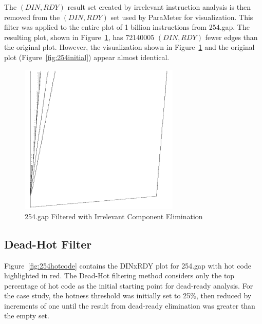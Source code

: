 \documentclass[defaultstyle,11pt]{thesis}
\begin{document}
The $(DIN,RDY)$ result set created by irrelevant instruction analysis is then
removed from the $(DIN,RDY)$ set used by ParaMeter for visualization.
This filter was applied to the entire plot of 1 billion instructions
from 254.gap.  The resulting plot, shown in
Figure~\ref{fig:254quickdead}, has 72140005 $(DIN,RDY)$ fewer edges
than the original plot.  However, the visualization shown in
Figure~\ref{fig:254quickdead} and the original plot
(Figure~\ref{fig:254initial}) appear almost identical.

\begin{figure}
\begin{center}
\includegraphics[width=3in]{images/254gap_quickdead}
\end{center}
\caption{254.gap Filtered with Irrelevant Component Elimination}
\label{fig:254quickdead}
\end{figure}

\subsection {Dead-Hot Filter}

Figure~\ref{fig:254hotcode} contains the DINxRDY plot for 254.gap with
hot code highlighted in red.  The Dead-Hot filtering method considers
only the top percentage of hot code as the initial starting point for
dead-ready analysis. For the case study, the hotness threshold was
initially set to 25\%, then reduced by increments of one until the
result from dead-ready elimination was greater than the empty set.
\end{document}
